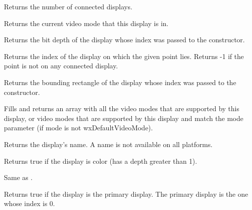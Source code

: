 \label{wxdisplaygetcount}


Returns the number of connected displays.


\label{wxdisplaygetcurrentmode}


Returns the current video mode that this display is in. 


\label{wxdisplaygetdepth}


Returns the bit depth of the display whose index was passed to the constructor.


\label{wxdisplaygetfrompoint}


Returns the index of the display on which the given point lies.  Returns -1 if
the point is not on any connected display.




\label{wxdisplaygetgeometry}


Returns the bounding rectangle of the display whose index was passed to the
constructor.


\label{wxdisplaygetmodes}


Fills and returns an array with all the video modes that
are supported by this display, or video modes that are 
supported by this display and match the mode parameter
(if mode is not wxDefaultVideoMode).


\label{wxdisplaygetname}


Returns the display's name.  A name is not available on all platforms.


\label{wxdisplayiscolour}


Returns true if the display is color (has a depth greater than 1).


\label{wxdisplayiscolor}


Same as .


\label{wxdisplayisprimary}


Returns true if the display is the primary display.  The primary display is the
one whose index is 0.

